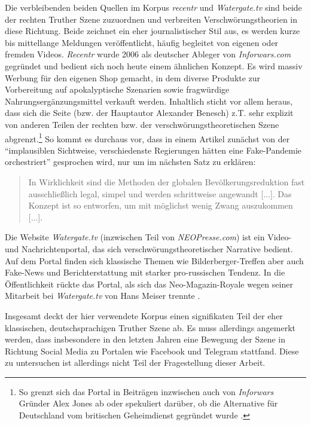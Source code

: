 Die verbleibenden beiden Quellen im Korpus \textit{recentr} und \textit{Watergate.tv} sind beide der rechten Truther Szene zuzuordnen und verbreiten Verschwörungstheorien in diese Richtung.
Beide zeichnet ein eher journalistischer Stil aus, es werden kurze bis mittellange Meldungen veröffentlicht, häufig begleitet von eigenen oder fremden Videos.
\textit{Recentr} wurde 2006 als deutscher Ableger von \textit{Inforwars.com} gegründet und bedient sich noch heute einem ähnlichen Konzept.
Es wird massiv Werbung für den eigenen Shop gemacht, in dem diverse Produkte zur Vorbereitung auf apokalyptische Szenarien sowie fragwürdige Nahrungsergänzungsmittel verkauft werden.
Inhaltlich sticht vor allem heraus, dass sich die Seite (bzw. der Hauptautor Alexander Benesch) z.T. sehr explizit von anderen Teilen der rechten bzw. der verschwörungstheoretischen Szene abgrenzt.\footnote{So grenzt sich das Portal in Beiträgen inzwischen auch von \textit{Inforwars} Gründer Alex Jones ab \parencite{recentr-jones} oder spekuliert darüber, ob die Alternative für Deutschland vom britischen Geheimdienst gegründet wurde \parencite{recentr-afd}.}
So kommt es durchaus vor, dass in einem Artikel zunächst von der \enquote{implausiblen Sichtweise, verschiedenste Regierungen hätten eine Fake-Pandemie orchestriert} \parencite{recentr-population} gesprochen wird, nur um im nächsten Satz zu erklären: 

\begin{quotation}
    In Wirklichkeit sind die Methoden der globalen Bevölkerungsreduktion fast ausschließlich legal, simpel und werden schrittweise angewandt [...]. Das Konzept ist so entworfen, um mit möglichst wenig Zwang auszukommen [...]. \parencite{recentr-population}
\end{quotation} 

Die Website \textit{Watergate.tv} (inzwischen Teil von \textit{NEOPresse.com}) ist ein Video- und Nachrichtenportal, das sich verschwörungstheoretischer Narrative bedient. 
Auf dem Portal finden sich klassische Themen wie Bilderberger-Treffen \parencite[vgl.][]{watergate-bilderberger} aber auch Fake-News und Berichterstattung mit starker pro-russischen Tendenz.
In die Öffentlichkeit rückte das Portal, als sich das Neo-Magazin-Royale wegen seiner Mitarbeit bei \textit{Watergate.tv} von Hans Meiser trennte \parencite[vgl.][]{spiegel-watergate}.

Insgesamt deckt der hier verwendete Korpus einen signifikaten Teil der eher klassischen, deutschsprachigen Truther Szene ab.
Es muss allerdings angemerkt werden, dass insbesondere in den letzten Jahren eine Bewegung der Szene in Richtung Social Media zu Portalen wie Facebook und Telegram stattfand.
Diese zu untersuchen ist allerdings nicht Teil der Fragestellung dieser Arbeit.

